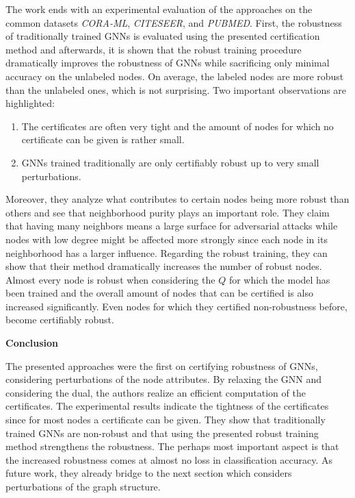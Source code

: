 \documentclass[a4paper,preprint]{sig-alternate}
\begin{document}
The work ends with an experimental evaluation of the approaches on the common datasets \textit{CORA-ML}, 
\textit{CITESEER}, and \textit{PUBMED}. First, the robustness of traditionally trained GNNs is evaluated using the presented
certification method and afterwards, it is shown that the robust training procedure dramatically improves the robustness 
of GNNs while sacrificing only minimal accuracy on the unlabeled nodes. On average, the labeled nodes are more robust than the unlabeled
ones, which is not surprising. Two important observations are highlighted:
\begin{enumerate}
    \item The certificates are often very tight and the amount of nodes for which no certificate can be given is rather small.
    \item GNNs trained traditionally are only certifiably robust up to very small perturbations.
\end{enumerate}
Moreover, they analyze what contributes to certain nodes being more robust than others and see that neighborhood purity plays an important role.
They claim that having many neighbors means a large surface for adversarial attacks while nodes with low degree might be affected more strongly 
since each node in its neighborhood has a larger influence.\newline
Regarding the robust training, they can show that their method dramatically increases the number of robust nodes. Almost every node
is robust when considering the $Q$ for which the model has been trained and the overall amount of nodes that can be certified is also 
increased significantly. Even nodes for which they certified non-robustness before, become certifiably robust.\newline

\textbf{Conclusion}\newline

The presented approaches were the first on certifying robustness of GNNs, considering perturbations of the node attributes.
By relaxing the GNN and considering the dual, the authors realize an efficient computation of the certificates.
The experimental results indicate the tightness of the certificates since for most nodes a certificate can be given.
They show that traditionally trained GNNs are non-robust and that using the presented robust training method strengthens the robustness.
The perhaps most important aspect is that the increased robustness comes at almost no loss in classification accuracy.
As future work, they already bridge to the next section which considers perturbations of the graph structure.
\end{document}
